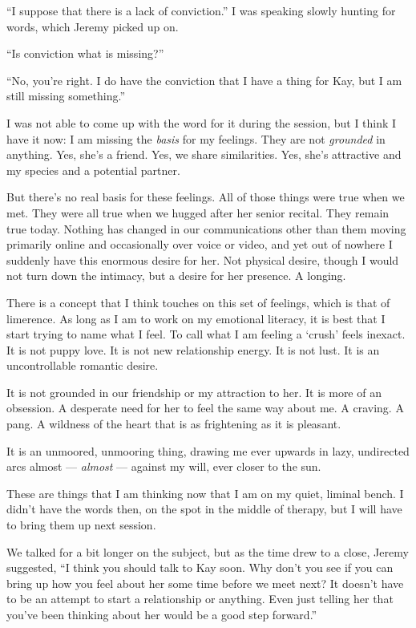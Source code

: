 ``I suppose that there is a lack of conviction.'' I was speaking slowly hunting for words, which Jeremy picked up on.

``Is conviction what is missing?''

``No, you're right. I do have the conviction that I have a thing for Kay, but I am still missing something.''

I was not able to come up with the word for it during the session, but I think I have it now: I am missing the \emph{basis} for my feelings. They are not \emph{grounded} in anything. Yes, she's a friend. Yes, we share similarities. Yes, she's attractive and my species and a potential partner.

But there's no real basis for these feelings. All of those things were true when we met. They were all true when we hugged after her senior recital. They remain true today. Nothing has changed in our communications other than them moving primarily online and occasionally over voice or video, and yet out of nowhere I suddenly have this enormous desire for her. Not physical desire, though I would not turn down the intimacy, but a desire for her presence. A longing.

There is a concept that I think touches on this set of feelings, which is that of limerence. As long as I am to work on my emotional literacy, it is best that I start trying to name what I feel. To call what I am feeling a `crush' feels inexact. It is not puppy love. It is not new relationship energy. It is not lust. It is an uncontrollable romantic desire.

It is not grounded in our friendship or my attraction to her. It is more of an obsession. A desperate need for her to feel the same way about me. A craving. A pang. A wildness of the heart that is as frightening as it is pleasant.

It is an unmoored, unmooring thing, drawing me ever upwards in lazy, undirected arcs almost --- \emph{almost} --- against my will, ever closer to the sun.

These are things that I am thinking now that I am on my quiet, liminal bench. I didn't have the words then, on the spot in the middle of therapy, but I will have to bring them up next session.

We talked for a bit longer on the subject, but as the time drew to a close, Jeremy suggested, ``I think you should talk to Kay soon. Why don't you see if you can bring up how you feel about her some time before we meet next? It doesn't have to be an attempt to start a relationship or anything. Even just telling her that you've been thinking about her would be a good step forward.''

